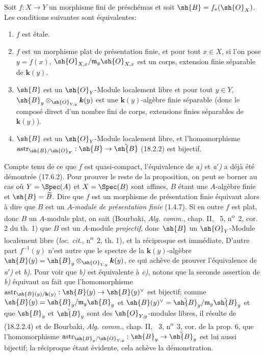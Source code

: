 
\begin{proposition}[18.2.3]
Soit $f:X\to Y$ un morphisme \textup{fini} de préschémas et soit $\sh{B}=f_*(\sh{O}_X)$. Les conditions suivantes sont équivalentes:
\begin{enumerate}
  \item[\textup{a)}] $f$ est étale.
  \item[\textup{a$'$)}] $f$ est un morphisme plat de présentation finie, et pour tout $x\in X$, si l'on pose $y=f(x)$, $\sh{O}_{X,x}/\mathfrak m_y\sh{O}_{X,x}$ est un corps, extension finie séparable de $\boldsymbol{k}(y)$.
  \item[\textup{b)}] $\sh{B}$ est un $\sh{O}_Y$-Module localement libre et pour tout $y\in Y$, $\sh{B}_y\otimes_{\sh{O}_{Y,y}}\boldsymbol{k}(y)$ est une $\boldsymbol{k}(y)$-algèbre finie séparable \textup{(donc le composé direct d'un nombre fini de corps, extensions finies séparables de $\boldsymbol{k}(y)$)}.
  \item[\textup{c)}] $\sh{B}$ est un $\sh{O}_Y$-Module localement libre, et l'homomorphisme $\operatorname{astr}_{\sh{B}/\sh{O}_Y}:\sh{B}\to\check{\sh{B}}$ \textup{(18.2.2)} est bijectif.
\end{enumerate}
\end{proposition}

Compte tenu de ce que $f$ est quasi-compact, l'équivalence de \emph{a)} et \emph{a$'$)} a déjà été démontrée (17.6.2). Pour prouver le reste de la proposition, on peut se borner au cas où $Y=\Spec(A)$ et $X=\Spec(B)$ sont affines, $B$ étant une $A$-algèbre finie et $\sh{B}=\widetilde B$. Dire que $f$ est un morphisme de présentation finie équivaut alors à dire que $B$ est un $A$-\emph{module de présentation finie} (1.4.7). Si en outre $f$ est plat, donc $B$ un $A$-module plat, on sait (Bourbaki, \emph{Alg. comm.}, chap. II, \textsection~5, n\textsuperscript{o}~2, cor. 2 du th. 1) que $B$ est un $A$-module \emph{projectif}, donc $\sh{B}$ un $\sh{O}_Y$-Module localement libre (\emph{loc. cit.}, n\textsuperscript{o}~2, th. 1), et la réciproque est immédiate. D'autre part $f^{-1}(y)$ n'est autre que le spectre de la $\boldsymbol{k}(y)$-algèbre $\sh{B}(y)=\sh{B}_y\otimes_{\sh{O}_{Y,y}}\boldsymbol{k}(y)$, ce qui achève de prouver l'équivalence de \emph{a$'$)} et \emph{b)}. Pour voir que \emph{b)} est équivalente à \emph{c)}, notons que la seconde assertion de \emph{b)} équivaut au fait que l'homomorphisme $\operatorname{astr}_{\sh{B}(y)/\mathbf{k}(y)}:\sh{B}(y)\to\sh{B}(y)^\vee$ est bijectif; comme $\sh{B}(y)=\sh{B}_y/\mathfrak m_y\sh{B}_y$ et $\sh{B}(y)^\vee=\check{\sh{B}}_y/\mathfrak m_y\check{\sh{B}}_y$ et que $\sh{B}_y$ et $\check{\sh{B}}_y$ sont des $\sh{O}_{Y,y}$-modules libres, il résulte de (18.2.2.4) et de Bourbaki, \emph{Alg. comm.}, chap. II, \textsection~3, n\textsuperscript{o}~3, cor. de la prop. 6, que l'homomorphisme $\operatorname{astr}_{\sh{B}_y/\sh{O}_{Y,y}}:\sh{B}_y\to\check{\sh{B}}_y$ est lui aussi bijectif; la réciproque étant évidente, cela achève la démonstration.

